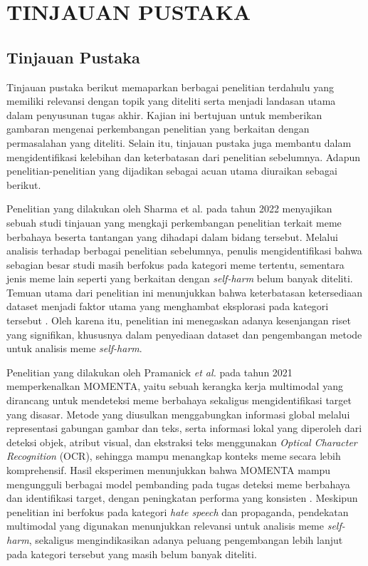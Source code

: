 \newpage
\chapter{TINJAUAN PUSTAKA} \label{Bab II}

\section{Tinjauan Pustaka} \label{II.Tinjauan}
Tinjauan pustaka berikut memaparkan berbagai penelitian terdahulu yang memiliki relevansi dengan topik yang diteliti serta menjadi landasan utama dalam penyusunan tugas akhir. Kajian ini bertujuan untuk memberikan gambaran mengenai perkembangan penelitian yang berkaitan dengan permasalahan yang diteliti. Selain itu, tinjauan pustaka juga membantu dalam mengidentifikasi kelebihan dan keterbatasan dari penelitian sebelumnya. Adapun penelitian-penelitian yang dijadikan sebagai acuan utama diuraikan sebagai berikut.

Penelitian yang dilakukan oleh Sharma et al. pada tahun 2022 menyajikan sebuah studi tinjauan yang mengkaji perkembangan penelitian terkait meme berbahaya beserta tantangan yang dihadapi dalam bidang tersebut. Melalui analisis terhadap berbagai penelitian sebelumnya, penulis mengidentifikasi bahwa sebagian besar studi masih berfokus pada kategori meme tertentu, sementara jenis meme lain seperti yang berkaitan dengan \textit{self-harm} belum banyak diteliti. Temuan utama dari penelitian ini menunjukkan bahwa keterbatasan ketersediaan dataset menjadi faktor utama yang menghambat eksplorasi pada kategori tersebut \cite{Sharma2022HarmfulMemes}. Oleh karena itu, penelitian ini menegaskan adanya kesenjangan riset yang signifikan, khususnya dalam penyediaan dataset dan pengembangan metode untuk analisis meme \textit{self-harm}.

Penelitian yang dilakukan oleh Pramanick \textit{et al.} pada tahun 2021 memperkenalkan MOMENTA, yaitu sebuah kerangka kerja multimodal yang dirancang untuk mendeteksi meme berbahaya sekaligus mengidentifikasi target yang disasar. Metode yang diusulkan menggabungkan informasi global melalui representasi gabungan gambar dan teks, serta informasi lokal yang diperoleh dari deteksi objek, atribut visual, dan ekstraksi teks menggunakan \textit{Optical Character Recognition} (OCR), sehingga mampu menangkap konteks meme secara lebih komprehensif. Hasil eksperimen menunjukkan bahwa MOMENTA mampu mengungguli berbagai model pembanding pada tugas deteksi meme berbahaya dan identifikasi target, dengan peningkatan performa yang konsisten \cite{pramanick2021momenta}. Meskipun penelitian ini berfokus pada kategori \textit{hate speech} dan propaganda, pendekatan multimodal yang digunakan menunjukkan relevansi untuk analisis meme \textit{self-harm}, sekaligus mengindikasikan adanya peluang pengembangan lebih lanjut pada kategori tersebut yang masih belum banyak diteliti.

